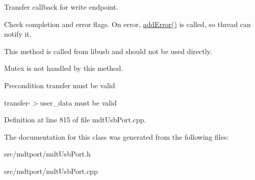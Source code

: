Transfer callback for write endpoint. 

Check completion and error flags. On error, \hyperlink{classmdt_usb_port_aa857e94b4167c53b26573042ee3af280}{addError()} is called, so thread can notify it.

This method is called from libusb and should not be used directly.

Mutex is not handled by this method.

\begin{DoxyPrecond}{Precondition}
transfer must be valid 

transfer-\/$>$user\_\-data must be valid 
\end{DoxyPrecond}


Definition at line 815 of file mdtUsbPort.cpp.



The documentation for this class was generated from the following files:\begin{DoxyCompactItemize}
\item 
src/mdtport/mdtUsbPort.h\item 
src/mdtport/mdtUsbPort.cpp\end{DoxyCompactItemize}

